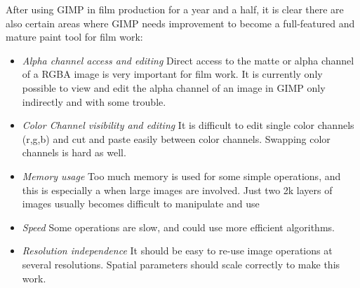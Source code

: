 After using GIMP in film production for a year and a half, it is clear there
are also certain areas where GIMP needs improvement to become a full-featured
and mature paint tool for film work:
\begin{itemize}

\item {\em Alpha channel access and editing}
Direct access to the matte or alpha channel of a RGBA image is very important
for film work. It is currently only possible to view and edit the alpha channel
of an image in GIMP only indirectly and with some trouble.  

\item {\em Color Channel visibility and editing}
It is difficult to edit single color channels (r,g,b) and cut and paste easily
between color channels. Swapping color channels is hard as well.

\item {\em Memory usage}
Too much memory is used for some simple operations, and this is especially 
a when large images are involved. Just two 2k layers of images usually becomes
difficult to manipulate and use

\item {\em Speed}
Some operations are slow, and could use more efficient algorithms.

\item {\em Resolution independence} 
It should be easy to re-use image operations at several resolutions. Spatial
parameters should scale correctly to make this work.
\end{itemize}

